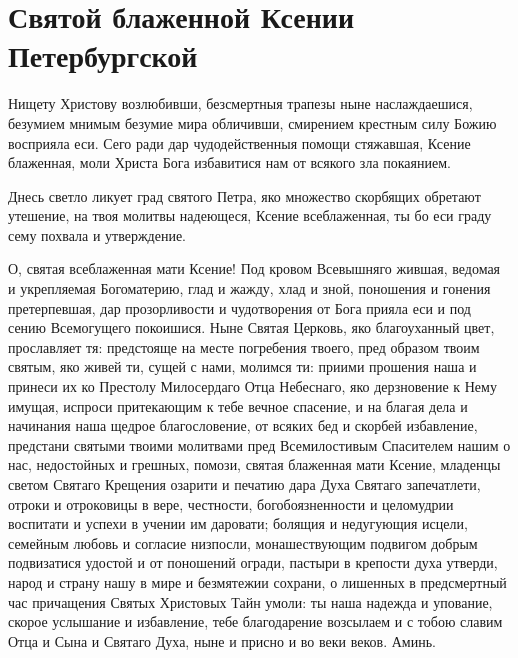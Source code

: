 \mychapterending





\section{Святой блаженной Ксении Петербургской}\label{sect:text623}\begin{mymulticols}



Нищету Христову возлюбивши, безсмертныя трапезы ныне наслаждаешися, безумием мнимым безумие мира обличивши, смирением крестным силу Божию восприяла еси. Сего ради дар чудодейственныя помощи стяжавшая, Ксение блаженная, моли Христа Бога избавитися нам от всякого зла покаянием.




Днесь светло ликует град святого Петра, яко множество скорбящих обретают утешение, на твоя молитвы надеющеся, Ксение всеблаженная, ты бо еси граду сему похвала и утверждение.




О, святая всеблаженная мати Ксение! Под кровом Всевышняго жившая, ведомая и укрепляемая Богоматерию, глад и жажду, хлад и зной, поношения и гонения претерпевшая, дар прозорливости и чудотворения от Бога прияла еси и под сению Всемогущего покоишися. Ныне Святая Церковь, яко благоуханный цвет, прославляет тя: предстояще на месте погребения твоего, пред образом твоим святым, яко живей ти, сущей с нами, молимся ти: приими прошения наша и принеси их ко Престолу Милосердаго Отца Небеснаго, яко дерзновение к Нему имущая, испроси притекающим к тебе вечное спасение, и на благая дела и начинания наша щедрое благословение, от всяких бед и скорбей избавление, предстани святыми твоими молитвами пред Всемилостивым Спасителем нашим о нас, недостойных и грешных, помози, святая блаженная мати Ксение, младенцы светом Святаго Крещения озарити и печатию дара Духа Святаго запечатлети, отроки и отроковицы в вере, честности, богобоязненности и целомудрии воспитати и успехи в учении им даровати; болящия и недугующия исцели, семейным любовь и согласие низпосли, монашествующим подвигом добрым подвизатися удостой и от поношений огради, пастыри в крепости духа утверди, народ и страну нашу в мире и безмятежии сохрани, о лишенных в предсмертный час причащения Святых Христовых Тайн умоли: ты наша надежда и упование, скорое услышание и избавление, тебе благодарение возсылаем и с тобою славим Отца и Сына и Святаго Духа, ныне и присно и во веки веков. Аминь.

\end{mymulticols}

